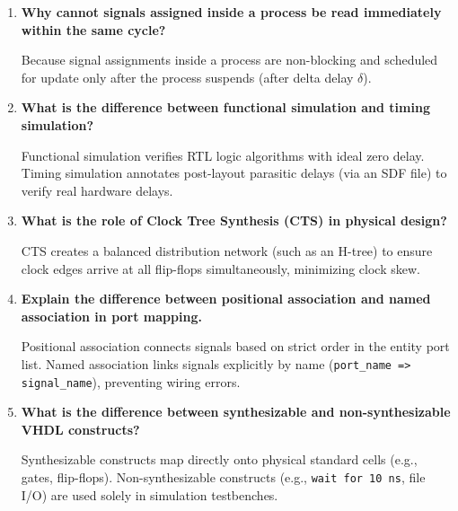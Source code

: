 \documentclass[12pt,a4paper]{article}
\newcommand{\Q}[1]{\textbf{#1}\par\noindent\ignorespaces}
\begin{document}
\begin{tcolorbox}[exambox, title={\textbf{Frequently Asked / Viva Questions}}]
\begin{enumerate}[topsep=0pt, label=\textbf{Q\arabic*.}, itemsep=5pt]
  \item \Q{Why cannot signals assigned inside a process be read immediately within the same cycle?}
  Because signal assignments inside a process are non-blocking and scheduled for update only after the process suspends (after delta delay $\delta$).

  \item \Q{What is the difference between functional simulation and timing simulation?}
  Functional simulation verifies RTL logic algorithms with ideal zero delay. Timing simulation annotates post-layout parasitic delays (via an SDF file) to verify real hardware delays.

  \item \Q{What is the role of Clock Tree Synthesis (CTS) in physical design?}
  CTS creates a balanced distribution network (such as an H-tree) to ensure clock edges arrive at all flip-flops simultaneously, minimizing clock skew.

  \item \Q{Explain the difference between positional association and named association in port mapping.}
  Positional association connects signals based on strict order in the entity port list. Named association links signals explicitly by name (\texttt{port\_name => signal\_name}), preventing wiring errors.

  \item \Q{What is the difference between synthesizable and non-synthesizable VHDL constructs?}
  Synthesizable constructs map directly onto physical standard cells (e.g., gates, flip-flops). Non-synthesizable constructs (e.g., \texttt{wait for 10 ns}, file I/O) are used solely in simulation testbenches.
\end{enumerate}
\end{tcolorbox}
\end{document}
